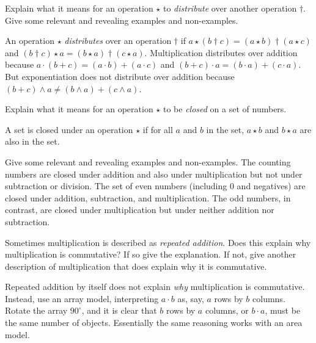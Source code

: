 \documentclass[nooutcomes]{ximera}
\begin{document}
\begin{problem}Explain what it means for an operation $\star$ to \textit{distribute}
  over another operation $\dagger$. Give some relevant and revealing
  examples and non-examples.
\begin{freeResponse}
\begin{hint}
An operation $\star$ \textit{distributes} over an operation $\dagger$ if $a\star(b\dagger c) = (a\star b) \dagger (a\star c)$ and $(b\dagger c)\star a = (b\star a) \dagger (c\star a)$.  
Multiplication distributes over addition because $a\cdot(b+c) = (a\cdot b)+(a\cdot c)$ and $(b+c)\cdot a = (b\cdot a)+(c\cdot a)$.  
But exponentiation does not distribute over addition because $(b+c)\wedge a \ne (b\wedge a)+(c\wedge a)$.
\end{hint}
\end{freeResponse}
\end{problem} 

\begin{problem}Explain what it means for an operation $\star$ to be \textit{closed}
  on a set of numbers. 
\begin{freeResponse}
\begin{hint}
A set is closed under an operation $\star$ if for all $a$ and $b$ in the set, $a\star b$ and $b\star a$ are also in the set.  
\end{hint}
\end{freeResponse}
\begin{problem}
Give some relevant and revealing examples and non-examples.
The counting numbers are closed under addition and also under multiplication but not under subtraction or division.  The set of even numbers (including $0$ and negatives) are closed under addition, subtraction, and multiplication.  The odd numbers, in contrast, are closed under multiplication but under neither addition nor subtraction.

\end{problem}
\end{problem} 

\begin{problem}Sometimes multiplication is described as \textit{repeated
  addition}. Does this explain why multiplication is commutative? If
  so give the explanation. If not, give another description of
  multiplication that does explain why it is commutative.
\begin{freeResponse}
\begin{hint}
Repeated addition by itself does not explain \textit{why} multiplication is commutative.  Instead, use an array model, interpreting $a\cdot b$ as, say, $a$ rows by $b$ columns.  Rotate the array $90^\circ$, and it is clear that $b$ rows by $a$ columns, or $b\cdot a$, must be the same number of objects.  Essentially the same reasoning works with an area model.  
\end{hint}
\end{freeResponse}
\end{problem} 
\end{document}
